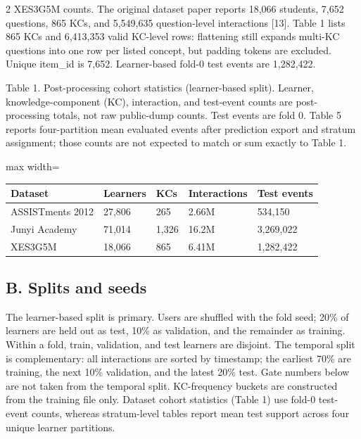 \documentclass[10pt,a4paper]{article}
\begin{document}
\begin{multicols}{2}
XES3G5M counts. The original dataset paper reports 18,066 students, 7,652 questions, 865 KCs, and 5,549,635 question-level interactions [13]. Table 1 lists 865 KCs and 6,413,353 valid KC-level rows: flattening still expands multi-KC questions into one row per listed concept, but padding tokens are excluded. Unique item\_id is 7,652. Learner-based fold-0 test events are 1,282,422.


\vspace{0.7em}
\begin{center}
{\fontsize{8}{9.5}\selectfont Table 1. Post-processing cohort statistics (learner-based split). Learner, knowledge-component (KC), interaction, and test-event counts are post-processing totals, not raw public-dump counts. Test events are fold 0. Table 5 reports four-partition mean evaluated events after prediction export and stratum assignment; those counts are not expected to match or sum exactly to Table 1.\par}
\vspace{0.35em}
\begin{adjustbox}{max width=\columnwidth}
{\footnotesize
\begin{tabular}{@{}lllll@{}}
\toprule
Dataset & Learners & KCs & Interactions & Test events \\
\midrule
ASSISTments 2012 & 27,806 & 265 & 2.66M & 534,150 \\
Junyi Academy & 71,014 & 1,326 & 16.2M & 3,269,022 \\
XES3G5M & 18,066 & 865 & 6.41M & 1,282,422 \\
\bottomrule
\end{tabular}}
\end{adjustbox}
\end{center}


\subsection*{B. Splits and seeds}

The learner-based split is primary. Users are shuffled with the fold seed; 20\% of learners are held out as test, 10\% as validation, and the remainder as training. Within a fold, train, validation, and test learners are disjoint. The temporal split is complementary: all interactions are sorted by timestamp; the earliest 70\% are training, the next 10\% validation, and the latest 20\% test. Gate numbers below are not taken from the temporal split. KC-frequency buckets are constructed from the training file only. Dataset cohort statistics (Table 1) use fold-0 test-event counts, whereas stratum-level tables report mean test support across four unique learner partitions.


\end{multicols}
\end{document}
